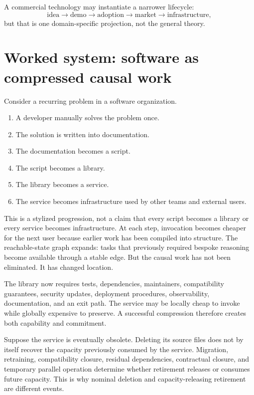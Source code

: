 \documentclass[11pt]{article}
\begin{document}
A commercial technology may instantiate a narrower lifecycle:
\[
\text{idea}\rightarrow\text{demo}\rightarrow\text{adoption}\rightarrow\text{market}\rightarrow\text{infrastructure},
\]
but that is one domain-specific projection, not the general theory.

\section{Worked system: software as compressed causal work}

Consider a recurring problem in a software organization.

\begin{enumerate}[leftmargin=*]
\item A developer manually solves the problem once.
\item The solution is written into documentation.
\item The documentation becomes a script.
\item The script becomes a library.
\item The library becomes a service.
\item The service becomes infrastructure used by other teams and external users.
\end{enumerate}

This is a stylized progression, not a claim that every script becomes a library or every service becomes infrastructure. At each step, invocation becomes cheaper for the next user because earlier work has been compiled into structure. The reachable-state graph expands: tasks that previously required bespoke reasoning become available through a stable edge. But the causal work has not been eliminated. It has changed location.

The library now requires tests, dependencies, maintainers, compatibility guarantees, security updates, deployment procedures, observability, documentation, and an exit path. The service may be locally cheap to invoke while globally expensive to preserve. A successful compression therefore creates both capability and commitment.

Suppose the service is eventually obsolete. Deleting its source files does not by itself recover the capacity previously consumed by the service. Migration, retraining, compatibility closure, residual dependencies, contractual closure, and temporary parallel operation determine whether retirement releases or consumes future capacity. This is why nominal deletion and capacity-releasing retirement are different events.
\end{document}
